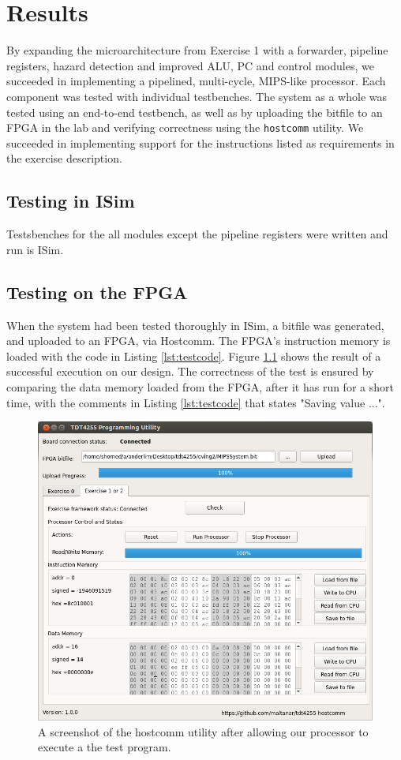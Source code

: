 \chapter{Results}

By expanding the microarchitecture from Exercise 1 \cite{compendium} with a forwarder, pipeline registers, hazard detection and improved ALU, PC and control modules, we succeeded in implementing a pipelined, multi-cycle, MIPS-like processor.
Each component was tested with individual testbenches.
The system as a whole was tested using an end-to-end testbench, as well as by uploading the bitfile to an FPGA in the lab and verifying correctness using the \texttt{hostcomm} utility.
We succeeded in implementing support for the instructions listed as requirements in the exercise description.

\section{Testing in ISim}
Testsbenches for the all modules except the pipeline registers were written and run is ISim. 

\section{Testing on the FPGA}
When the system had been tested thoroughly in ISim, a bitfile was generated, and uploaded to an FPGA, via Hostcomm. The FPGA's instruction memory is loaded with the code in Listing \ref{lst:testcode}. Figure \ref{fig:hostcomm} shows the result of a successful execution on our design. The correctness of the test is ensured by comparing the data memory loaded from the FPGA, after it has run for a short time, with the comments in Listing \ref{lst:testcode} that states "Saving value ...".

\begin{figure}[h!]
    \includegraphics[width=\linewidth]{img/hostcomm_result.png}
    \caption{A screenshot of the hostcomm utility after allowing our processor to execute a the test program.}
    \label{fig:hostcomm}
\end{figure}